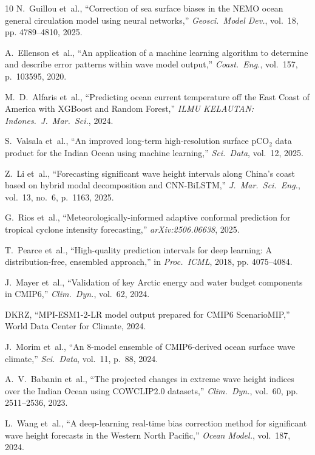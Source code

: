 \documentclass[conference]{IEEEtran}
\begin{document}
\begin{thebibliography}{10}
N.~Guillou et~al., ``Correction of sea surface biases in the NEMO ocean general circulation model using neural networks,'' \emph{Geosci.~Model Dev.}, vol.~18, pp. 4789--4810, 2025.

A.~Ellenson et~al., ``An application of a machine learning algorithm to determine and describe error patterns within wave model output,'' \emph{Coast.~Eng.}, vol.~157, p.~103595, 2020.

M.~D.~Alfaris et~al., ``Predicting ocean current temperature off the East Coast of America with XGBoost and Random Forest,'' \emph{ILMU KELAUTAN: Indones.~J.~Mar.~Sci.}, 2024.

S.~Valsala et~al., ``An improved long-term high-resolution surface pCO$_2$ data product for the Indian Ocean using machine learning,'' \emph{Sci.~Data}, vol.~12, 2025.

Z.~Li et~al., ``Forecasting significant wave height intervals along China's coast based on hybrid modal decomposition and CNN-BiLSTM,'' \emph{J.~Mar.~Sci.~Eng.}, vol.~13, no.~6, p.~1163, 2025.

G.~Rios et~al., ``Meteorologically-informed adaptive conformal prediction for tropical cyclone intensity forecasting,'' \emph{arXiv:2506.06638}, 2025.

T.~Pearce et~al., ``High-quality prediction intervals for deep learning: A distribution-free, ensembled approach,'' in \emph{Proc.\ ICML}, 2018, pp. 4075--4084.

J.~Mayer et~al., ``Validation of key Arctic energy and water budget components in CMIP6,'' \emph{Clim.~Dyn.}, vol.~62, 2024.

DKRZ, ``MPI-ESM1-2-LR model output prepared for CMIP6 ScenarioMIP,'' World Data Center for Climate, 2024.

J.~Morim et~al., ``An 8-model ensemble of CMIP6-derived ocean surface wave climate,'' \emph{Sci.~Data}, vol.~11, p.~88, 2024.

A.~V.~Babanin et~al., ``The projected changes in extreme wave height indices over the Indian Ocean using COWCLIP2.0 datasets,'' \emph{Clim.~Dyn.}, vol.~60, pp. 2511--2536, 2023.

L.~Wang et~al., ``A deep-learning real-time bias correction method for significant wave height forecasts in the Western North Pacific,'' \emph{Ocean Model.}, vol.~187, 2024.


\end{thebibliography}
\end{document}
